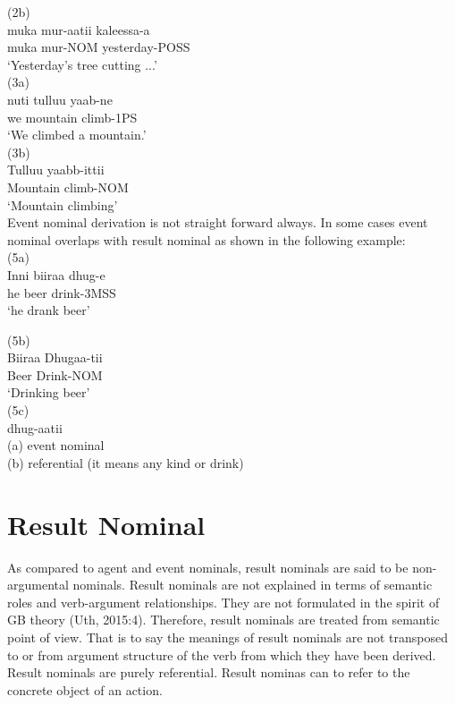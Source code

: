 \documentclass[11pt,a4paper]{article}
\begin{document}
(2b)	\\
\indent muka		mur-aatii	kaleessa-a\\
\indent muka		mur-NOM	yesterday-POSS\\
\indent ‘Yesterday’s tree cutting ...’\\


(3a) 	\\
\indent nuti 		tulluu 		yaab-ne 	\\	
\indent we		mountain	climb-1PS\\
\indent ‘We climbed a mountain.’\\


(3b) \\
\indent Tulluu yaabb-ittii 	\\	
\indent Mountain climb-NOM	\\
\indent ‘Mountain climbing’\\

Event nominal derivation is not straight forward always. In some cases event nominal overlaps with result nominal as shown in the following example:\\

(5a)  \\
\indent Inni 	 biiraa 	dhug-e\\
\indent he 	 beer 	drink-3MSS\\
\indent ‘he drank beer’\indent

(5b) 	\\
\indent Biiraa 	Dhugaa-tii\\
\indent Beer  	Drink-NOM\\
\indent‘Drinking beer’\\

(5c)\\
\indent	dhug-aatii\\
\indent (a) event nominal \\
\indent (b) referential (it means any kind or drink)\\

\section{Result Nominal}
As compared to agent and event nominals, result nominals are said to be non-argumental nominals. Result nominals are not explained in terms of semantic roles and verb-argument relationships. They are not formulated in the spirit of GB theory (Uth, 2015:4). Therefore, result nominals are treated from semantic point of view. That is to say the meanings of result nominals are not transposed to or from argument structure of the verb from which they have been derived. Result nominals are purely  referential. Result nominas can to  refer to the concrete object of an action.
\end{document}
